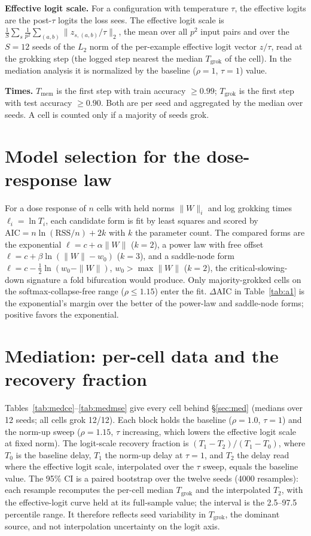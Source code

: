 \textbf{Effective logit scale.} For a configuration with temperature $\tau$, the effective logits are the
post-$\tau$ logits the loss sees. The effective logit scale is
$\frac{1}{S}\sum_s \frac{1}{p^2}\sum_{(a,b)} \|z_{s,(a,b)}/\tau\|_2$, the mean over all $p^2$ input pairs
and over the $S=12$ seeds of the $L_2$ norm of the per-example effective logit vector $z/\tau$, read at
the grokking step (the logged step nearest the median $T_{\mathrm{grok}}$ of the cell). In the mediation
analysis it is normalized by the baseline ($\rho=1$, $\tau=1$) value.

\textbf{Times.} $T_{\mathrm{mem}}$ is the first step with train accuracy $\ge 0.99$; $T_{\mathrm{grok}}$ is
the first step with test accuracy $\ge 0.90$. Both are per seed and aggregated by the median over seeds. A
cell is counted only if a majority of seeds grok.

\section{Model selection for the dose-response law}

For a dose response of $n$ cells with held norms $\|W\|_i$ and log grokking times $\ell_i=\ln T_i$, each
candidate form is fit by least squares and scored by $\mathrm{AIC}=n\ln(\mathrm{RSS}/n)+2k$ with $k$ the
parameter count. The compared forms are the exponential $\ell=c+\alpha\|W\|$ ($k=2$), a power law with free
offset $\ell=c+\beta\ln(\|W\|-w_0)$ ($k=3$), and a saddle-node form $\ell=c-\tfrac12\ln(w_0-\|W\|)$,
$w_0>\max\|W\|$ ($k=2$), the critical-slowing-down signature a fold bifurcation would produce. Only
majority-grokked cells on the softmax-collapse-free range ($\rho\le 1.15$) enter the fit. $\Delta$AIC in
Table~\ref{tab:a1} is the exponential's margin over the better of the power-law and saddle-node forms;
positive favors the exponential.

\section{Mediation: per-cell data and the recovery fraction}

Tables~\ref{tab:medce}--\ref{tab:medmse} give every cell behind \S\ref{sec:med} (medians over 12 seeds;
all cells grok 12/12). Each block holds the baseline ($\rho=1.0$, $\tau=1$) and the norm-up sweep
($\rho=1.15$, $\tau$ increasing, which lowers the effective logit scale at fixed norm). The logit-scale
recovery fraction is $(T_1-T_2)/(T_1-T_0)$, where $T_0$ is the baseline delay, $T_1$ the norm-up delay at
$\tau=1$, and $T_2$ the delay read where the effective logit scale, interpolated over the $\tau$ sweep,
equals the baseline value. The 95\% CI is a paired bootstrap over the twelve seeds (4000 resamples): each
resample recomputes the per-cell median $T_{\mathrm{grok}}$ and the interpolated $T_2$, with the
effective-logit curve held at its full-sample value; the interval is the 2.5--97.5 percentile range. It
therefore reflects seed variability in $T_{\mathrm{grok}}$, the dominant source, and not interpolation
uncertainty on the logit axis.


